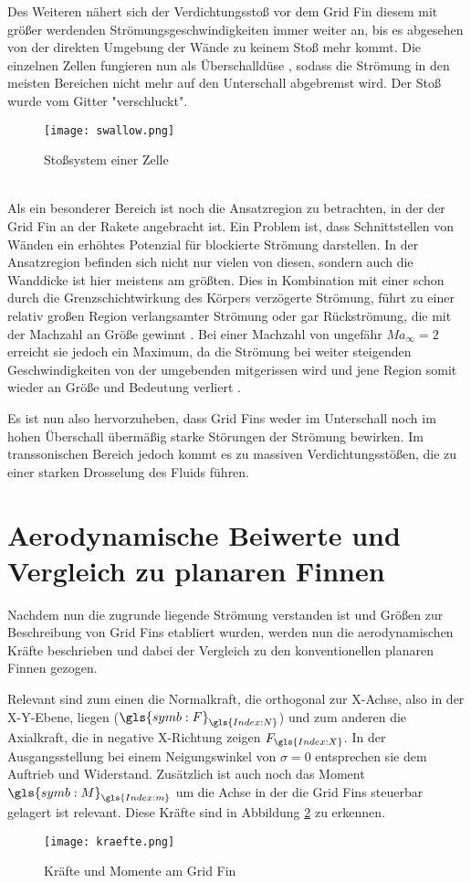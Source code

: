 Des Weiteren nähert sich der Verdichtungsstoß vor dem Grid Fin diesem mit größer werdenden Strömungsgeschwindigkeiten immer weiter an, bis es abgesehen von der direkten Umgebung der Wände zu keinem Stoß mehr kommt. Die einzelnen Zellen fungieren nun als Überschalldüse \cite{stroemung}, sodass die Strömung in den meisten Bereichen nicht mehr auf den Unterschall abgebremst wird. Der Stoß wurde vom Gitter "verschluckt".
\begin{figure}[h]
	\centering
	\texttt{[image: swallow.png]}
	\begin{flushright}
	\end{flushright}
	\caption{Stoßsystem einer Zelle}
	\label{abb_stoesse}
\end{figure}\\
Als ein besonderer Bereich ist noch die Ansatzregion zu betrachten, in der der Grid Fin an der Rakete angebracht ist. Ein Problem ist, dass Schnittstellen von Wänden ein erhöhtes Potenzial für blockierte Strömung darstellen. In der Ansatzregion befinden sich nicht nur vielen von diesen, sondern auch die Wanddicke ist hier meistens am größten. Dies in Kombination mit einer schon durch die Grenzschichtwirkung des Körpers verzögerte Strömung, führt zu einer relativ großen Region verlangsamter Strömung oder gar Rückströmung, die mit der Machzahl an Größe gewinnt \cite{stroemung}. Bei einer Machzahl von ungefähr $Ma_\infty = 2$ erreicht sie jedoch ein Maximum, da die Strömung bei weiter steigenden Geschwindigkeiten von der umgebenden mitgerissen wird und jene Region somit wieder an Größe und Bedeutung verliert \cite{stroemung}.

Es ist nun also hervorzuheben, dass Grid Fins weder im Unterschall noch im hohen Überschall übermäßig starke Störungen der Strömung bewirken. Im transsonischen Bereich jedoch kommt es zu massiven Verdichtungsstößen, die zu einer starken Drosselung des Fluids führen.
\newpage

\section{Aerodynamische Beiwerte und Vergleich zu planaren Finnen}
Nachdem nun die zugrunde liegende Strömung verstanden ist und Größen zur Beschreibung von Grid Fins etabliert wurden, werden nun die aerodynamischen Kräfte beschrieben und dabei der Vergleich zu den konventionellen planaren Finnen gezogen.

Relevant sind zum einen die Normalkraft, die orthogonal zur X-Achse, also in der X-Y-Ebene, liegen ($\gls{symb:F}_{\gls{Index:N}}$) und zum anderen die Axialkraft, die in negative X-Richtung zeigen $F_{\gls{Index:X}}$. In der Ausgangsstellung bei einem Neigungswinkel von $\sigma = 0$ entsprechen sie dem Auftrieb und Widerstand. Zusätzlich ist auch noch das Moment $\gls{symb:M}_{\gls{Index:m}}$ um die Achse in der die Grid Fins steuerbar gelagert ist relevant. Diese Kräfte sind in Abbildung \ref{abb_kraefte} zu erkennen.
\begin{figure}[h]
	\centering
	\texttt{[image: kraefte.png]}
	\caption{Kräfte und Momente am Grid Fin}
	\label{abb_kraefte}
\end{figure}\\
